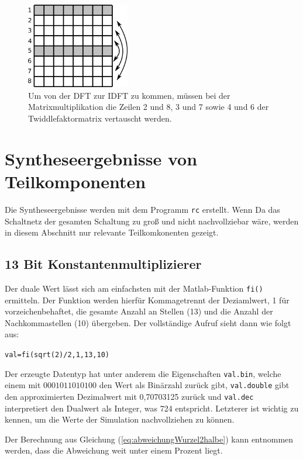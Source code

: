 \begin{figure}[ht]
 \centering
 \includegraphics[width=0.4\textwidth]{img/IDFT_Zeilentausch.png}
 \caption{Um von der DFT zur IDFT zu kommen, müssen bei der Matrixmultiplikation die Zeilen 2 und 8, 3 und 7 sowie 4 und 6 der Twiddlefaktormatrix vertauscht werden.}
 \label{pic:IDFT_Zeilentausch}
\end{figure}




\section{Syntheseergebnisse von Teilkomponenten}\label{sec:Syntheseergebnisse}
Die Syntheseergebnisse werden mit dem Programm \texttt{rc} erstellt. Wenn 
Da das Schaltnetz der gesamten Schaltung zu groß und nicht nachvollziebar wäre, werden in diesem Abschnitt nur relevante Teilkomkonenten gezeigt.

\subsection{13 Bit Konstantenmultiplizierer}\label{sec:Konstantenmultiplizierer}

Der duale Wert lässt sich am einfachsten mit der Matlab-Funktion \texttt{fi()} ermitteln. Der Funktion werden hierfür Kommagetrennt der Deziamlwert, 1 für vorzeichenbehaftet,
die gesamte Anzahl an Stellen (13) und die Anzahl der Nachkommastellen (10) übergeben. Der vollständige Aufruf sieht dann wie folgt aus:

\texttt{val=fi(sqrt(2)/2,1,13,10)}

Der erzeugte Datentyp hat unter anderem die Eigenschaften \texttt{val.bin}, welche einem mit $0001011010100$ den Wert als Binärzahl zurück gibt, 
\texttt{val.double} gibt den approximierten Dezimalwert mit 0,70703125 zurück und \texttt{val.dec} interpretiert den Dualwert als Integer, was 724 entspricht.
Letzterer ist wichtig zu kennen, um die Werte der Simulation nachvollziehen zu können.

Der Berechnung aus Gleichung (\ref{eq:abweichungWurzel2halbe}) kann entnommen werden, dass die Abweichung weit unter einem Prozent liegt.

